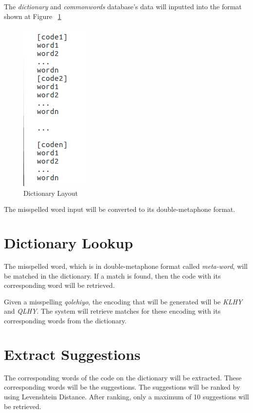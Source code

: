 \documentclass[12pt]{book}
\begin{document}
The \textit{dictionary} and \textit{commonwords} database's data will inputted into the format shown at Figure ~\ref{dictionary}

\begin{figure}
\begin{center}	
\includegraphics[scale=.60]{dictionary.png}
	\caption[Dictionary Layout]
	{Dictionary Layout}	
	\label{dictionary}
\end{center}
\end{figure}

The misspelled word input will be converted to its double-metaphone format. 

\section{Dictionary Lookup}
The misspelled word, which is in double-metaphone format called \textit{meta-word}, will be matched in the dictionary. If a match is found, then the code with its corresponding word will be retrieved. 

Given a misspelling \textit{qolehiyo}, the encoding that will be generated will be \textit{KLHY} and \textit{QLHY}. The system will retrieve matches for these encoding with its corresponding words from the dictionary.

\section{Extract Suggestions}
The corresponding words of the code on the dictionary will be extracted. These corresponding words will be the suggestions. The suggestions will be ranked by using Levenshtein Distance. After ranking, only a maximum of 10 suggestions will be retrieved.
\end{document}
